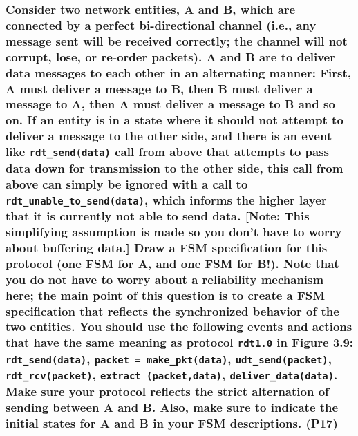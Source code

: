 \subsubsection{Consider two network entities, A and B, which are connected by a perfect bi-directional channel (i.e., any message sent will be received correctly; the channel will not corrupt, lose, or re-order packets). A and B are to deliver data messages to each other in an alternating manner: First, A must deliver a message to B, then B must deliver a message to A, then A must deliver a message to B and so on. If an entity is in a state where it should not attempt to deliver a message to the other side, and there is an event like \texttt{rdt\_send(data)} call from above that attempts to pass data down for transmission to the other side, this call from above can simply be ignored with a call to \texttt{rdt\_unable\_to\_send(data)}, which informs the higher layer that it is currently not able to send data. [Note: This simplifying assumption is made so you don't have to worry about buffering data.] Draw a FSM specification for this protocol (one FSM for A, and one FSM for B!). Note that you do not have to worry about a reliability mechanism here; the main point of this question is to create a FSM specification that reflects the synchronized behavior of the two entities. You should use the following events and actions that have the same meaning as protocol \texttt{rdt1.0} in Figure 3.9: \texttt{rdt\_send(data)}, \texttt{packet = make\_pkt(data)}, \texttt{udt\_send(packet)}, \texttt{rdt\_rcv(packet)}, \texttt{extract (packet,data)}, \texttt{deliver\_data(data)}. Make sure your protocol reflects the strict alternation of sending between A and B. Also, make sure to indicate the initial states for A and B in your FSM descriptions. (P17)}

